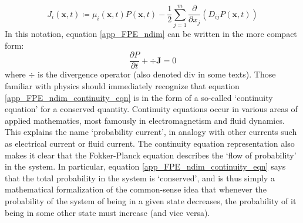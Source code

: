 \begin{equation*}
J_i(\mathbf{x},t) \coloneqq \mu_i(\mathbf{x},t)P(\mathbf{x},t) - \frac{1}{2}\sum\limits_{j=1}^{m}\frac{\partial}{\partial x_j}\left(D_{ij}P(\mathbf{x},t)\right)
\end{equation*}
In this notation, equation \eqref{app_FPE_ndim} can be written in the more compact form:
\begin{equation}
\label{app_FPE_ndim_continuity_eqn}
\frac{\partial P}{\partial t}  + \div{\mathbf{J}} = 0
\end{equation}
where $\div$ is the divergence operator (also denoted $\mathrm{div}$ in some texts). Those familiar with physics should immediately recognize that equation \eqref{app_FPE_ndim_continuity_eqn} is in the form of a so-called `continuity equation' for a conserved quantity. Continuity equations occur in various areas of applied mathematics, most famously in electromagnetism and fluid dynamics. This explains the name `probability current', in analogy with other currents such as electrical current or fluid current. The continuity equation representation also  makes it clear that the Fokker-Planck equation describes the `flow of probability' in the system. In particular, equation \eqref{app_FPE_ndim_continuity_eqn} says that the total probability in the system is `conserved', and is thus simply a mathematical formalization of the common-sense idea that whenever the probability of the system of being in a given state decreases, the probability of it being in some other state must increase (and vice versa).